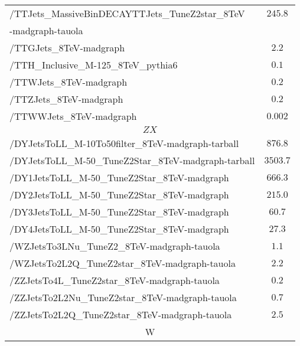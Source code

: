 \begin{table}[!Hhtb]
\begin{center}
{\begin{tabular}{|l|c|}
/TTJets\_MassiveBinDECAYTTJets\_TuneZ2star\_8TeV  &  $245.8$       \\
-madgraph-tauola                                        &               \\
/TTGJets\_8TeV-madgraph                                  &  $2.2$              \\%
/TTH\_Inclusive\_M-125\_8TeV\_pythia6                    &  $0.1$               \\
/TTWJets\_8TeV-madgraph                                  &  $0.2$              \\
/TTZJets\_8TeV-madgraph                                  &  $0.2$                \\
/TTWWJets\_8TeV-madgraph                                 &  $0.002$\\%

\hline
\multicolumn{2}{|c|}{$ZX$ }\\
\hline
/DYJetsToLL\_M-10To50filter\_8TeV-madgraph-tarball      &   $876.8$               \\
/DYJetsToLL\_M-50\_TuneZ2Star\_8TeV-madgraph-tarball    &   $3503.7$               \\
/DY1JetsToLL\_M-50\_TuneZ2Star\_8TeV-madgraph           &   $666.3$               \\
/DY2JetsToLL\_M-50\_TuneZ2Star\_8TeV-madgraph           &   $215.0$               \\
/DY3JetsToLL\_M-50\_TuneZ2Star\_8TeV-madgraph           &   $60.7$               \\
/DY4JetsToLL\_M-50\_TuneZ2Star\_8TeV-madgraph           &   $27.3$               \\
/WZJetsTo3LNu\_TuneZ2\_8TeV-madgraph-tauola             &  $1.1$                \\
/WZJetsTo2L2Q\_TuneZ2star\_8TeV-madgraph-tauola         &  $2.2$                \\
/ZZJetsTo4L\_TuneZ2star\_8TeV-madgraph-tauola           &  $0.2$                \\
/ZZJetsTo2L2Nu\_TuneZ2star\_8TeV-madgraph-tauola        &  $0.7$                \\
/ZZJetsTo2L2Q\_TuneZ2star\_8TeV-madgraph-tauola         &  $2.5$                \\
\hline
\multicolumn{2}{|c|}{W}\\
\hline


\end{tabular}}
\end{center}
\end{table}
